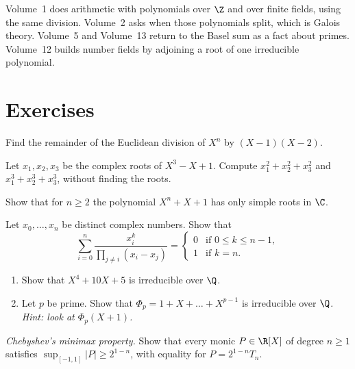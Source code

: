 Volume~1 does arithmetic with polynomials over $\Z$ and over finite fields, using the same division. Volume~2 asks when those polynomials split, which is Galois theory. Volume~5 and Volume~13 return to the Basel sum as a fact about primes. Volume~12 builds number fields by adjoining a root of one irreducible polynomial.

\section{Exercises}

\begin{exercise}[$\star$]\label{ex:rem}
Find the remainder of the Euclidean division of $X^n$ by $(X-1)(X-2)$.
\end{exercise}

\begin{exercise}[$\star$]\label{ex:viete}
Let $x_1,x_2,x_3$ be the complex roots of $X^3-X+1$. Compute $x_1^2+x_2^2+x_3^2$ and $x_1^3+x_2^3+x_3^3$, without finding the roots.
\end{exercise}

\begin{exercise}[$\star\star$]\label{ex:simple}
Show that for $n\ge2$ the polynomial $X^n+X+1$ has only simple roots in $\C$.
\end{exercise}

\begin{exercise}[$\star\star$]\label{ex:lagsum}
Let $x_0,\dots,x_n$ be distinct complex numbers. Show that
\[
\sum_{i=0}^n\frac{x_i^k}{\prod_{j\ne i}(x_i-x_j)}=\begin{cases}0&\text{if }0\le k\le n-1,\\1&\text{if }k=n.\end{cases}
\]
\end{exercise}

\begin{exercise}[$\star\star$]\label{ex:eisen}
\begin{enumerate}[label=(\alph*)]
\item Show that $X^4+10X+5$ is irreducible over $\Q$.
\item Let $p$ be prime. Show that $\Phi_p=1+X+\dots+X^{p-1}$ is irreducible over $\Q$. \emph{Hint: look at $\Phi_p(X+1)$.}
\end{enumerate}
\end{exercise}

\begin{exercise}[$\star\star\star$]\label{ex:minimax}
\emph{Chebyshev's minimax property.} Show that every monic $P\in\R[X]$ of degree $n\ge1$ satisfies
$\sup_{[-1,1]}|P|\ge2^{1-n}$, with equality for $P=2^{1-n}T_n$.
\end{exercise}

